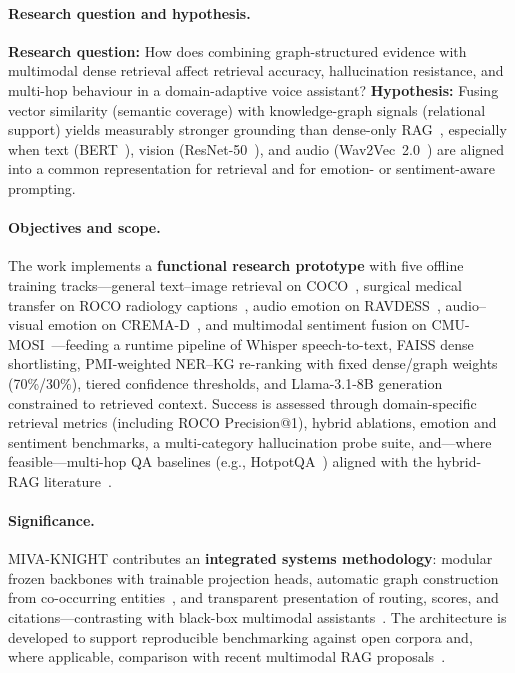 \paragraph{Research question and hypothesis.}
\textbf{Research question:} How does combining graph-structured evidence with multimodal dense retrieval affect retrieval accuracy, hallucination resistance, and multi-hop behaviour in a domain-adaptive voice assistant? \textbf{Hypothesis:} Fusing vector similarity (semantic coverage) with knowledge-graph signals (relational support) yields measurably stronger grounding than dense-only RAG~\cite{sarmah2024hybridrag}, especially when text (BERT~\cite{devlin2019bert}), vision (ResNet-50~\cite{he2016deep}), and audio (Wav2Vec~2.0~\cite{baevski2020wav2vec}) are aligned into a common representation for retrieval and for emotion- or sentiment-aware prompting.

\paragraph{Objectives and scope.}
The work implements a \textbf{functional research prototype} with five offline training tracks---general text--image retrieval on COCO~\cite{lin2014microsoft}, surgical medical transfer on ROCO radiology captions~\cite{pelka2018radiology}, audio emotion on RAVDESS~\cite{livingstone2018ryerson}, audio--visual emotion on CREMA-D~\cite{cao2014crema}, and multimodal sentiment fusion on CMU-MOSI~\cite{zadeh2016mosi}---feeding a runtime pipeline of Whisper speech-to-text, FAISS dense shortlisting, PMI-weighted NER--KG re-ranking with fixed dense/graph weights (70\%/30\%), tiered confidence thresholds, and Llama-3.1-8B generation constrained to retrieved context. Success is assessed through domain-specific retrieval metrics (including ROCO Precision@1), hybrid ablations, emotion and sentiment benchmarks, a multi-category hallucination probe suite, and---where feasible---multi-hop QA baselines (e.g., HotpotQA~\cite{yang2018hotpotqa}) aligned with the hybrid-RAG literature~\cite{tang2024multihop,sarmah2024hybridrag}.

\paragraph{Significance.}
MIVA-KNIGHT contributes an \textbf{integrated systems methodology}: modular frozen backbones with trainable projection heads, automatic graph construction from co-occurring entities~\cite{pan2024unifying}, and transparent presentation of routing, scores, and citations---contrasting with black-box multimodal assistants~\cite{kadam2022multimodal}. The architecture is developed to support reproducible benchmarking against open corpora and, where applicable, comparison with recent multimodal RAG proposals~\cite{zhai2024samrag,liu2025hmrag,li2024omnisearch}.

